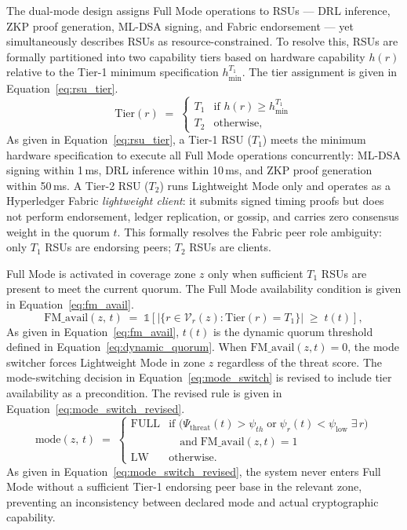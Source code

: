 The dual-mode design assigns Full Mode operations to RSUs ---
DRL inference, ZKP proof generation, ML-DSA signing, and Fabric
endorsement --- yet simultaneously describes RSUs as
resource-constrained. To resolve this, RSUs are formally
partitioned into two capability tiers based on hardware
capability $h(r)$ relative to the Tier-1 minimum specification
$h_{\min}^{T_1}$. The tier assignment is given in
Equation~\eqref{eq:rsu_tier}.
%
\begin{equation}
  \mathrm{Tier}(r) \;=\;
  \begin{cases}
    T_1 & \text{if } h(r) \geq h_{\min}^{T_1} \\
    T_2 & \text{otherwise,}
  \end{cases}
  \label{eq:rsu_tier}
\end{equation}
%
As given in Equation~\eqref{eq:rsu_tier}, a Tier-1 RSU ($T_1$)
meets the minimum hardware specification to execute all Full Mode
operations concurrently: ML-DSA signing within 1\,ms, DRL
inference within 10\,ms, and ZKP proof generation within
50\,ms. A Tier-2 RSU ($T_2$) runs Lightweight Mode only and
operates as a Hyperledger Fabric \emph{lightweight client}: it
submits signed timing proofs but does not perform endorsement,
ledger replication, or gossip, and carries zero consensus weight
in the quorum $t$. This formally resolves the Fabric peer role
ambiguity: only $T_1$ RSUs are endorsing peers; $T_2$ RSUs are
clients.

Full Mode is activated in coverage zone $z$ only when sufficient
$T_1$ RSUs are present to meet the current quorum. The Full Mode
availability condition is given in Equation~\eqref{eq:fm_avail}.
%
\begin{equation}
  \mathrm{FM\_avail}(z,\,t) \;=\;
    \mathbb{1}\!\left[
      \bigl|\{r \in \mathcal{V}_r(z) :
        \mathrm{Tier}(r) = T_1\}\bigr|
      \;\geq\; t(t)
    \right],
  \label{eq:fm_avail}
\end{equation}
%
As given in Equation~\eqref{eq:fm_avail}, $t(t)$ is the dynamic
quorum threshold defined in
Equation~\eqref{eq:dynamic_quorum}. When
$\mathrm{FM\_avail}(z,t)=0$, the mode switcher forces
Lightweight Mode in zone $z$ regardless of the threat score.
The mode-switching decision in Equation~\eqref{eq:mode_switch}
is revised to include tier availability as a precondition. The
revised rule is given in Equation~\eqref{eq:mode_switch_revised}.
%
\begin{equation}
  \mathrm{mode}(z,\,t) \;=\;
  \begin{cases}
    \mathrm{FULL} &
      \text{if }\bigl(\Psi_{\mathrm{threat}}(t)>\psi_{th}
      \;\text{or}\;
      \psi_r(t)<\psi_{\mathrm{low}}\;\exists\,r\bigr) \\
      &\quad\text{and}\;
      \mathrm{FM\_avail}(z,t)=1 \\[4pt]
    \mathrm{LW}   &
      \text{otherwise.}
  \end{cases}
  \label{eq:mode_switch_revised}
\end{equation}
%
As given in Equation~\eqref{eq:mode_switch_revised}, the system
never enters Full Mode without a sufficient Tier-1 endorsing peer
base in the relevant zone, preventing an inconsistency between
declared mode and actual cryptographic capability.


